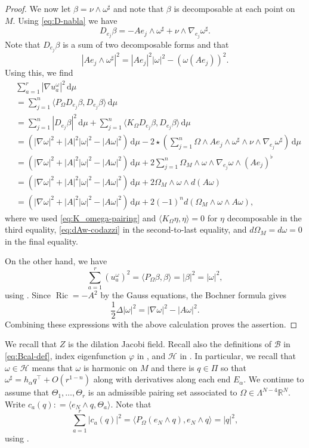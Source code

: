 \documentclass[11pt]{amsart}
\numberwithin{equation}{section}
\theoremstyle{plain}
\theoremstyle{definition}
\theoremstyle{remark}
\newcommand{\R}{\mathbb{R}}
\DeclareMathOperator{\Ric}{Ric}
\newcommand{\Hcal}{\mathcal H}
\newcommand{\Bcal}{\mathcal B}
\newcommand{\dvol}{\,\mathrm{d}\mu}%
\newcommand{\bangle}[1]{\langle #1 \rangle}
\begin{document}
\begin{proof}
We now let $\beta = \nu \wedge \omega^\sharp$ and note that $\beta$ is decomposable at each point on $M$. Using \eqref{eq:D-nabla} we have 
\[
D_{e_j} \beta = - A e_j \wedge \omega^\sharp + \nu \wedge \nabla_{e_j} \omega^\sharp. 
\]
Note that $D_{e_j}\beta$ is a sum of two decomposable forms and that
\[
|Ae_j \wedge \omega^\sharp|^2 = |Ae_j|^2 |\omega|^2 - (\omega(Ae_j))^2.
\]
Using this, we find 
\begin{align*}
& \sum_{a=1}^r |\nabla u_a^\omega|^2 \dvol \\
& = \sum_{j=1}^n \bangle{P_\Omega D_{e_j} \beta,D_{e_j} \beta }\dvol  \\
& = \sum_{j=1}^n   |D_{e_j}\beta|^2 \dvol +  \sum_{j=1}^n\bangle{K_\Omega D_{e_j} \beta,D_{e_j} \beta}\dvol \\
& = (|\nabla \omega|^2  + |A|^2 |\omega|^2 -  |A\omega|^2) \dvol - 2 \star \left( \sum_{j=1}^n \Omega \wedge Ae_j \wedge \omega^\sharp \wedge \nu \wedge \nabla_{e_j}\omega^\sharp \right) \dvol\\
& = (|\nabla \omega|^2  + |A|^2 |\omega|^2 -  |A\omega|^2) \dvol + 2   \sum_{j=1}^n \Omega_M  \wedge \omega  \wedge  \nabla_{e_j}\omega\wedge (Ae_j)^\flat \\
& = (|\nabla \omega|^2  + |A|^2 |\omega|^2 -  |A\omega|^2) \dvol + 2    \Omega_M  \wedge \omega \wedge d(A \omega) \\
& = (|\nabla \omega|^2  + |A|^2 |\omega|^2 -  |A\omega|^2) \dvol + 2(-1)^n d(\Omega_M  \wedge \omega \wedge A \omega) ,
\end{align*}
where we used \eqref{eq:K_omega-pairing} and $\bangle{K_\Omega \eta,\eta} = 0$ for $\eta$ decomposable in the third equality, \eqref{eq:dAw-codazzi} in the second-to-last equality, and $d\Omega_M = d\omega = 0$ in the final equality. 


On the other hand, we have
\[
\sum_{a=1}^r (u_a^\omega)^2 = \bangle{P_\Omega \beta,\beta} = |\beta|^2 = |\omega|^2,
\]
using . Since $\Ric = - A^2$ by the Gauss equations, the Bochner formula gives 
\[
\frac 12 \Delta |\omega|^2 = |\nabla \omega|^2 - |A\omega|^2 . 
\]
Combining these expressions with the above calculation proves the assertion. 
\end{proof}

We recall that $Z$ is the dilation Jacobi field. Recall also the definitions of $\Bcal$ in \eqref{eq:Bcal-def}, index eigenfunction $\varphi$ in , and $\Hcal$ in . In particular, we recall that $\omega \in \Hcal$ means that $\omega$ is harmonic on $M$ and there is $q\in \Pi$ so that $\omega^\sharp = h_\alpha q^\top + O(r^{1-n})$ along with derivatives along each end $E_\alpha$. We continue to assume that $\Theta_1,\dots,\Theta_r$ is an admissible pairing set associated to $\Omega \in \Lambda^{N-4} \R^N$. Write $c_a(q) : = \bangle{e_N\wedge q,\Theta_a}$. Note that
\begin{equation}\label{eq:sum-cq}
\sum_{a=1}^r |c_a(q)|^2 = \bangle{P_\Omega(e_N\wedge q),e_N\wedge q} = |q|^2,
\end{equation}
using . 
\end{document}
